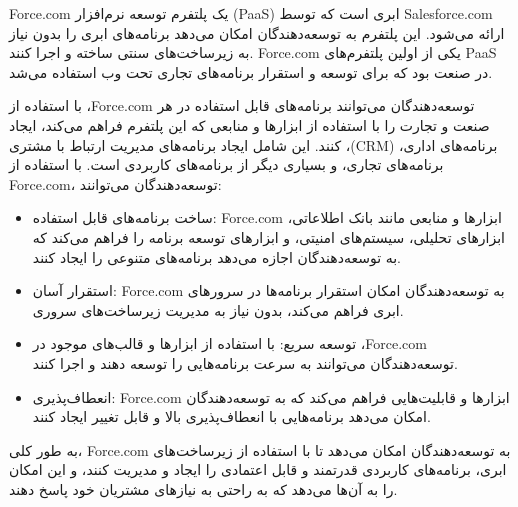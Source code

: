 \documentclass{book}
\begin{document}
            \begin{addinfo2}
                
                Force.com یک پلتفرم توسعه نرم‌افزار (PaaS) ابری است که توسط Salesforce.com ارائه می‌شود. این پلتفرم به توسعه‌دهندگان امکان می‌دهد برنامه‌های ابری را بدون نیاز به زیرساخت‌های سنتی ساخته و اجرا کنند. Force.com یکی از اولین پلتفرم‌های PaaS در صنعت بود که برای توسعه و استقرار برنامه‌های تجاری تحت وب استفاده می‌شد.

                با استفاده از ،Force.com توسعه‌دهندگان می‌توانند برنامه‌های قابل استفاده در هر صنعت و تجارت را با استفاده از ابزارها و منابعی که این پلتفرم فراهم می‌کند، ایجاد کنند. این شامل ایجاد برنامه‌های مدیریت ارتباط با مشتری ،(CRM) برنامه‌های اداری، برنامه‌های تجاری، و بسیاری دیگر از برنامه‌های کاربردی است. با استفاده از Force.com، توسعه‌دهندگان می‌توانند:

                \begin{itemize}
                    
                    \item ساخت برنامه‌های قابل استفاده: Force.com ابزارها و منابعی مانند بانک اطلاعاتی، ابزارهای تحلیلی، سیستم‌های امنیتی، و ابزارهای توسعه برنامه را فراهم می‌کند که به توسعه‌دهندگان اجازه می‌دهد برنامه‌های متنوعی را ایجاد کنند.

                    \item استقرار آسان: Force.com به توسعه‌دهندگان امکان استقرار برنامه‌ها در سرورهای ابری فراهم می‌کند، بدون نیاز به مدیریت زیرساخت‌های سروری.

                    \item توسعه سریع: با استفاده از ابزارها و قالب‌های موجود در ،Force.com توسعه‌دهندگان می‌توانند به سرعت برنامه‌هایی را توسعه دهند و اجرا کنند.

                    \item انعطاف‌پذیری: Force.com ابزارها و قابلیت‌هایی فراهم می‌کند که به توسعه‌دهندگان امکان می‌دهد برنامه‌هایی با انعطاف‌پذیری بالا و قابل تغییر ایجاد کنند.

                \end{itemize}

                به طور کلی، Force.com به توسعه‌دهندگان امکان می‌دهد تا با استفاده از زیرساخت‌های ابری، برنامه‌های کاربردی قدرتمند و قابل اعتمادی را ایجاد و مدیریت کنند، و این امکان را به آن‌ها می‌دهد که به راحتی به نیازهای مشتریان خود پاسخ دهند.

            \end{addinfo2}
\end{document}
